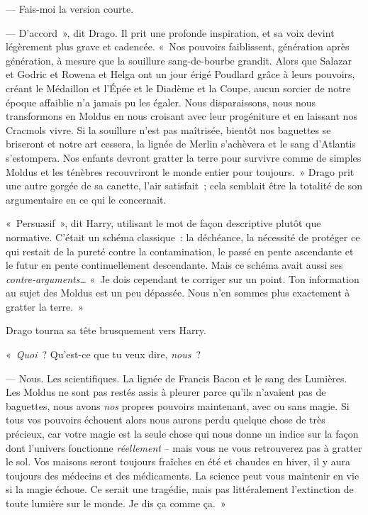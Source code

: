 --- Fais-moi la version courte.

--- D'accord~», dit Drago. Il prit une profonde inspiration, et sa voix devint légèrement plus grave et cadencée.
«~Nos pouvoirs faiblissent, génération après génération, à mesure que la souillure sang-de-bourbe grandit.
Alors que Salazar et Godric et Rowena et Helga ont un jour érigé Poudlard grâce à leurs pouvoirs, créant le Médaillon et l'Épée et le Diadème et la Coupe, aucun sorcier de notre époque affaiblie n'a jamais pu les égaler.
Nous disparaissons, nous nous transformons en Moldus en nous croisant avec leur progéniture et en laissant nos Cracmols vivre.
Si la souillure n'est pas maîtrisée, bientôt nos baguettes se briseront et notre art cessera, la lignée de Merlin s'achèvera et le sang d'Atlantis s'estompera.
Nos enfants devront gratter la terre pour survivre comme de simples Moldus et les ténèbres recouvriront le monde entier pour toujours.~»
Drago prit une autre gorgée de sa canette, l'air satisfait~; cela semblait être la totalité de son argumentaire en ce qui le concernait.

«~Persuasif~», dit Harry, utilisant le mot de façon descriptive plutôt que normative.
C'était un schéma classique~: la déchéance, la nécessité de protéger ce qui restait de la pureté contre la contamination, le passé en pente ascendante et le futur en pente continuellement descendante.
Mais ce schéma avait aussi ses \emph{contre-arguments}…
«~Je dois cependant te corriger sur un point.
Ton information au sujet des Moldus est un peu dépassée. 
Nous n'en sommes plus exactement à gratter la terre.~»

Drago tourna sa tête brusquement vers Harry.

«~\emph{Quoi}~? Qu'est-ce que tu veux dire, \emph{nous}~?

--- Nous. Les scientifiques. La lignée de Francis Bacon et le sang des Lumières.
Les Moldus ne sont pas restés assis à pleurer parce qu'ils n'avaient pas de baguettes, nous avons \emph{nos} propres pouvoirs maintenant, avec ou sans magie.
Si tous vos pouvoirs échouent alors nous aurons perdu quelque chose de très précieux, car votre magie est la seule chose qui nous donne un indice sur la façon dont l'univers fonctionne \emph{réellement} -- mais vous ne vous retrouverez pas à gratter le sol.
Vos maisons seront toujours fraîches en été et chaudes en hiver, il y aura toujours des médecins et des médicaments.
La science peut vous maintenir en vie si la magie échoue.
Ce serait une tragédie, mais pas littéralement l'extinction de toute lumière sur le monde.
Je dis ça comme ça.~»


